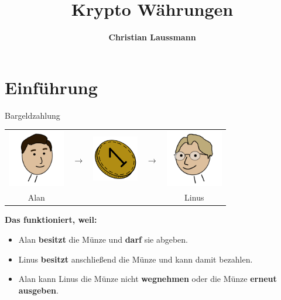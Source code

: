 \documentclass[aspectratio=169]{beamer}
\title{\textbf{\Huge Krypto Währungen}}
\author{\textcolor{secondarycolor}{\textbf{Christian Laussmann}}}
\date{}
\begin{document}
\frame{\titlepage}





\section{Einführung}


\begin{frame}{Bargeldzahlung}
    \begin{center}
        \begin{tabular}{ccccc}
            \includegraphics[width=2.5cm]{../icons/Alan} & {\Huge$\longrightarrow$} & \includegraphics[width=2cm]{../icons/Coin} & {\Huge$\longrightarrow$} & \includegraphics[width=2.5cm]{../icons/Linus}\\
            Alan & & & & Linus\\
        \end{tabular}
    \end{center}
    \vspace{0.5cm}

    \pause
    \textbf{Das funktioniert, weil:}
    \begin{itemize}
        \item Alan \textbf{besitzt} die Münze und \textbf{darf} sie abgeben.
        \item Linus \textbf{besitzt} anschließend die Münze und kann damit bezahlen.
        \item Alan kann Linus die Münze nicht \textbf{wegnehmen} oder die Münze \textbf{erneut ausgeben}.
    \end{itemize}
\end{frame}
\end{document}
